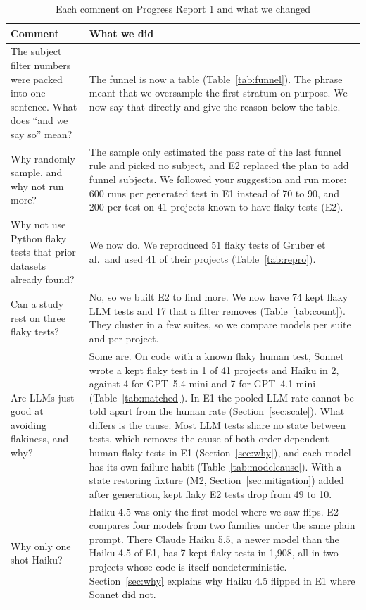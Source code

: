 \documentclass[sigconf,nonacm]{acmart}
\begin{document}
\begin{table}[t]
\caption{Each comment on Progress Report 1 and what we changed}
\label{tab:response}
\small
\begin{tabularx}{\textwidth}{p{5.0cm}X}
\toprule
Comment & What we did \\
\midrule
The subject filter numbers were packed into one sentence. What does ``and we say so'' mean? & The funnel is now a table (Table~\ref{tab:funnel}). The phrase meant that we oversample the first stratum on purpose. We now say that directly and give the reason below the table. \\
Why randomly sample, and why not run more? & The sample only estimated the pass rate of the last funnel rule and picked no subject, and E2 replaced the plan to add funnel subjects. We followed your suggestion and run more: 600 runs per generated test in E1 instead of 70 to 90, and 200 per test on 41 projects known to have flaky tests (E2). \\
Why not use Python flaky tests that prior datasets already found? & We now do. We reproduced 51 flaky tests of Gruber et al.\ and used 41 of their projects (Table~\ref{tab:repro}). \\
Can a study rest on three flaky tests? & No, so we built E2 to find more. We now have 74 kept flaky LLM tests and 17 that a filter removes (Table~\ref{tab:count}). They cluster in a few suites, so we compare models per suite and per project. \\
Are LLMs just good at avoiding flakiness, and why? & Some are. On code with a known flaky human test, Sonnet wrote a kept flaky test in 1 of 41 projects and Haiku in 2, against 4 for GPT~5.4 mini and 7 for GPT~4.1 mini (Table~\ref{tab:matched}). In E1 the pooled LLM rate cannot be told apart from the human rate (Section~\ref{sec:scale}). What differs is the cause. Most LLM tests share no state between tests, which removes the cause of both order dependent human flaky tests in E1 (Section~\ref{sec:why}), and each model has its own failure habit (Table~\ref{tab:modelcause}). With a state restoring fixture (M2, Section~\ref{sec:mitigation}) added after generation, kept flaky E2 tests drop from 49 to 10. \\
Why only one shot Haiku? & Haiku 4.5 was only the first model where we saw flips. E2 compares four models from two families under the same plain prompt. There Claude Haiku 5.5, a newer model than the Haiku 4.5 of E1, has 7 kept flaky tests in 1,908, all in two projects whose code is itself nondeterministic. Section~\ref{sec:why} explains why Haiku 4.5 flipped in E1 where Sonnet did not. \\

\end{tabularx}
\end{table}
\end{document}
